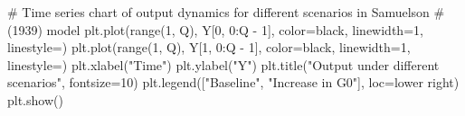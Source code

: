 \documentclass[
  letterpaper,
  DIV=11,
  numbers=noendperiod]{scrreprt}
\newenvironment{Shaded}{\begin{snugshade}}{\end{snugshade}}
\newcommand{\BuiltInTok}[1]{\textcolor[rgb]{0.00,0.23,0.31}{#1}}
\newcommand{\CommentTok}[1]{\textcolor[rgb]{0.37,0.37,0.37}{#1}}
\newcommand{\DecValTok}[1]{\textcolor[rgb]{0.68,0.00,0.00}{#1}}
\newcommand{\NormalTok}[1]{\textcolor[rgb]{0.00,0.23,0.31}{#1}}
\newcommand{\OperatorTok}[1]{\textcolor[rgb]{0.37,0.37,0.37}{#1}}
\newcommand{\StringTok}[1]{\textcolor[rgb]{0.13,0.47,0.30}{#1}}
\begin{document}
\begin{tcolorbox}
\begin{Shaded}
\begin{Highlighting}[]
\CommentTok{\# Time series chart of output dynamics for different scenarios in Samuelson }
\CommentTok{\#(1939) model}
\NormalTok{plt.plot(}\BuiltInTok{range}\NormalTok{(}\DecValTok{1}\NormalTok{, Q), Y[}\DecValTok{0}\NormalTok{, }\DecValTok{0}\NormalTok{:Q }\OperatorTok{{-}} \DecValTok{1}\NormalTok{], color}\OperatorTok{=}\StringTok{\textquotesingle{}black\textquotesingle{}}\NormalTok{, linewidth}\OperatorTok{=}\DecValTok{1}\NormalTok{, linestyle}\OperatorTok{=}\StringTok{\textquotesingle{}{-}\textquotesingle{}}\NormalTok{)}
\NormalTok{plt.plot(}\BuiltInTok{range}\NormalTok{(}\DecValTok{1}\NormalTok{, Q), Y[}\DecValTok{1}\NormalTok{, }\DecValTok{0}\NormalTok{:Q }\OperatorTok{{-}} \DecValTok{1}\NormalTok{], color}\OperatorTok{=}\StringTok{\textquotesingle{}black\textquotesingle{}}\NormalTok{, linewidth}\OperatorTok{=}\DecValTok{1}\NormalTok{, linestyle}\OperatorTok{=}\StringTok{\textquotesingle{}{-}{-}\textquotesingle{}}\NormalTok{)}
\NormalTok{plt.xlabel(}\StringTok{"Time"}\NormalTok{)}
\NormalTok{plt.ylabel(}\StringTok{"Y"}\NormalTok{)}
\NormalTok{plt.title(}\StringTok{"Output under different scenarios"}\NormalTok{, fontsize}\OperatorTok{=}\DecValTok{10}\NormalTok{)}
\NormalTok{plt.legend([}\StringTok{"Baseline"}\NormalTok{, }\StringTok{"Increase in G0"}\NormalTok{], loc}\OperatorTok{=}\StringTok{\textquotesingle{}lower right\textquotesingle{}}\NormalTok{)}
\NormalTok{plt.show()}


\end{Highlighting}
\end{Shaded}
\end{tcolorbox}
\end{document}
